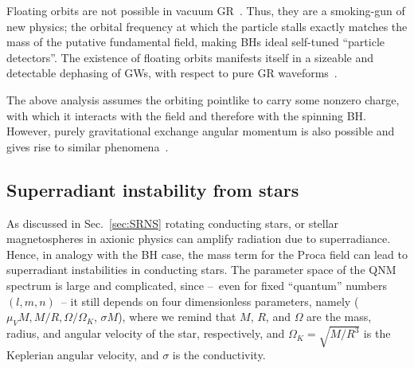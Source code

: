 \documentclass[11pt]{article}
\numberwithin{equation}{section} %
\begin{document}
Floating orbits are not possible in vacuum GR~\cite{Kapadia:2013kf}. Thus, they are a smoking-gun of new physics; the orbital 
frequency at which the particle stalls exactly matches the mass of the putative fundamental field, making BHs ideal self-tuned 
``particle detectors''. The existence of floating orbits manifests itself in a sizeable and detectable dephasing of GWs, with respect to pure GR waveforms~\cite{Cardoso:2011xi,Yunes:2011aa,Alsing:2011er,Barausse:2014tra,Fujita:2016yav}.

The above analysis assumes the orbiting pointlike to carry some nonzero charge, with which it interacts with the field and therefore with the spinning BH. However, purely gravitational exchange angular momentum is also possible and gives rise to similar phenomena~\cite{Ferreira:2017pth,Zhang:2018kib,Baumann:2019ztm}.

\subsection{Superradiant instability from stars}\label{sec:instabilitystar}
As discussed in Sec.~\ref{sec:SRNS} rotating conducting stars, or stellar magnetospheres in axionic physics can amplify radiation due to superradiance. Hence, in 
analogy with the BH case, the mass term for the Proca field can lead to superradiant 
instabilities in conducting stars. The parameter space of the QNM spectrum is large and complicated, since --~even for 
fixed ``quantum'' numbers $(l,m,n)$~-- it still depends on four dimensionless parameters, namely ($\mu_V M, M/R, 
\Omega/\Omega_K$, $\sigma M$), where we remind that $M$, $R$, and $\Omega$ are the mass, radius, and angular velocity 
of the star, respectively, and $\Omega_K=\sqrt{M/R^3}$ is the Keplerian angular velocity, and $\sigma$ is the 
conductivity.
\end{document}
